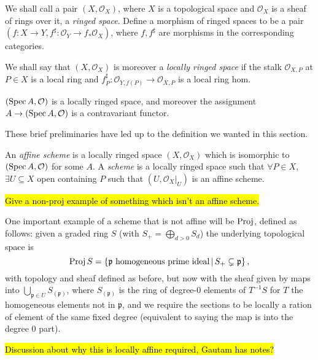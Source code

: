 \documentclass[000-main.tex]{subfiles}
\begin{document}
\begin{definition}
  We shall call a pair $(X, \mathcal{O}_X)$, where $X$ is a topological space and $\mathcal{O}_X$ is a sheaf of rings over it, a \emph{ringed space}.
  Define a morphism of ringed spaces to be a pair $(f : X \to Y, f^\sharp : \mathcal{O}_Y \to f_\ast \mathcal{O}_X)$, where $f, f^\sharp$ are morphisms in the corresponding categories.

  We shall say that $(X, \mathcal{O}_X)$ is moreover a \emph{locally ringed space} if the stalk $\mathcal{O}_{X, P}$ at $P \in X$ is a local ring and $f^\sharp_P : \mathcal{O}_{Y, f(P)} \to \mathcal{O}_{X, P}$ is a local ring hom.
\end{definition}

\begin{example}
  $(\operatorname{Spec} A, \mathcal{O})$ is a locally ringed space, and moreover the assignment $A \to (\operatorname{Spec} A , \mathcal{O})$ is a contravariant functor.
\end{example}

These brief preliminaries have led up to the definition we wanted in this section. 

\begin{definition}
  An \emph{affine scheme} is a locally ringed space $(X, \mathcal{O}_X)$ which is isomorphic to $(\operatorname{Spec} A, \mathcal{O})$ for some $A$.
  A \emph{scheme} is a locally ringed space such that $\forall P \in X$, $\exists U \subseteq X$ open containing $P$ such that $(U, \left . \mathcal{O}_X \right \rvert_{U})$ is an affine scheme.
\end{definition}

\begin{example}
  \hl{Give a non-proj example of something which isn't an affine scheme.}
\end{example}

One important example of a scheme that is not affine will be $\operatorname{Proj}$, defined as follows: given a graded ring $S$ (with $S_+ = \bigoplus_{d > 0 } S_d$) the underlying topological space is 
\[
  \operatorname{Proj} S = \left \lbrace \mathfrak{p} \text{ homogeneous prime ideal} \, | \, S_+ \subsetneq \mathfrak{p} \right \rbrace ,
\] 
with topology and sheaf defined as before, but now with the sheaf given by maps into $\bigcup_{\mathfrak{p} \in U} S_{(\mathfrak{p})}$, where $S_{(\mathfrak{p})}$ is the ring of degree-0 elements of $T^{-1}S$ for $T$ the homogeneous elements not in $\mathfrak{p}$, and we require the sections to be locally a ration of element of the same fixed degree (equivalent to saying the map is into the degree 0 part). 

\hl{Discussion about why this is locally affine required, Gautam has notes?} 
\end{document}
